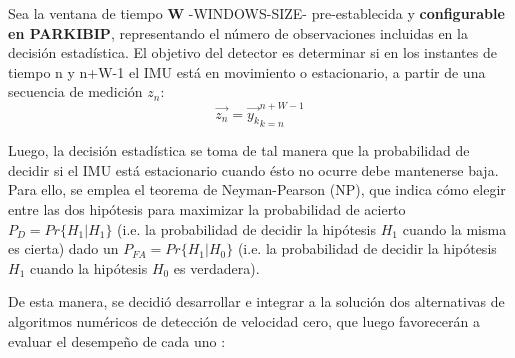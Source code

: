 \noindent Sea la ventana de tiempo \textbf{W} -WINDOWS-SIZE- pre-establecida y \textbf{configurable en PARKIBIP}, representando el número de observaciones incluidas en la decisión estadística. El objetivo del detector es determinar si en los instantes de tiempo n y n+W-1 el IMU está en movimiento o estacionario, a partir de una secuencia de medición $z_n$: 
\begin{equation*}
    \vec{z_n} = {\vec{y_k}}_{k=n}^{n+W-1}
\end{equation*}

\noindent Luego, la decisión estadística se toma de tal manera que la probabilidad de decidir si el IMU está estacionario cuando ésto no ocurre debe mantenerse baja. Para ello, se emplea el teorema de Neyman-Pearson (NP), que indica cómo elegir entre las dos hipótesis para maximizar la probabilidad de acierto $P_D = Pr\{H_1|H_1\}$ (i.e. la probabilidad de decidir la hipótesis $H_1$ cuando la misma es cierta) dado un $P_{FA} = Pr\{H_1|H_0\}$ (i.e. la probabilidad de decidir la hipótesis $H_1$ cuando la hipótesis $H_0$ es verdadera).

De esta manera, se decidió desarrollar e integrar a la solución dos alternativas de algoritmos numéricos de detección de velocidad cero, que luego favorecerán a evaluar el desempeño de cada uno \label{base-detectors}:

